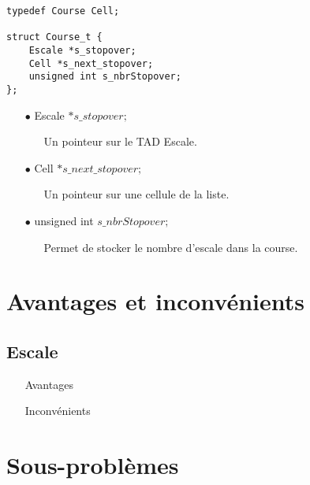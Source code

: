 \documentclass[a4paper, 11pt, oneside]{article}
\begin{document}
		\begin{lstlisting}
typedef Course Cell;

struct Course_t {
	Escale *s_stopover;
	Cell *s_next_stopover;
	unsigned int s_nbrStopover;
};
		\end{lstlisting}
		
		\begin{itemize}
			\item[$\bullet$] Escale $*s\_stopover;$
			\begin{itemize}
				\item[] Un pointeur sur le TAD Escale.
			\end{itemize}
			\item[$\bullet$] Cell $*s\_next\_stopover;$
			\begin{itemize}
				\item[] Un pointeur sur une cellule de la liste.
			\end{itemize}
			\item[$\bullet$] unsigned int $s\_nbrStopover;$
			\begin{itemize}
				\item[] Permet de stocker le nombre d'escale dans la course.
			\end{itemize}
		\end{itemize}
		
\section{Avantages et inconvénients}

	\subsection{Escale}
	
		\begin{itemize}
			\item[] Avantages
			\begin{itemize}
				\item[]
			\end{itemize}
			\item[] Inconvénients
			\begin{itemize}
				\item[] 
			\end{itemize}
		\end{itemize}
		
\section{Sous-problèmes}
\end{document}
